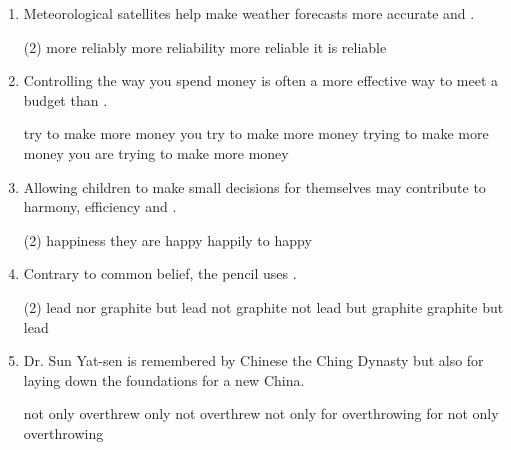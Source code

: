 \begin{enumerate}
\item Meteorological satellites help make weather forecasts more accurate and \ttu.
\begin{tasks}(2)
  \task more reliably
  \task more reliability
  \task more reliable
  \task it is reliable
\end{tasks}

\item Controlling the way you spend money is often a more effective way to meet a budget than \ttu.
\begin{tasks}
  \task try to make more money
  \task you try to make more money
  \task trying to make more money
  \task you are trying to make more money
\end{tasks}

\item Allowing children to make small decisions for themselves may contribute to harmony, efficiency and \ttu.
\begin{tasks}(2)
  \task happiness
  \task they are happy
  \task happily
  \task to happy
\end{tasks}

\item Contrary to common belief, the pencil uses \ttu.
\begin{tasks}(2)
  \task lead nor graphite
  \task but lead not graphite
  \task not lead but graphite
  \task graphite but lead
\end{tasks}

\item Dr. Sun Yat-sen is remembered by Chinese \ttu the Ching Dynasty but also for laying down the foundations for a new China.
\begin{tasks}
  \task not only overthrew
  \task only not overthrew
  \task not only for overthrowing
  \task for not only overthrowing
\end{tasks}

\end{enumerate}

